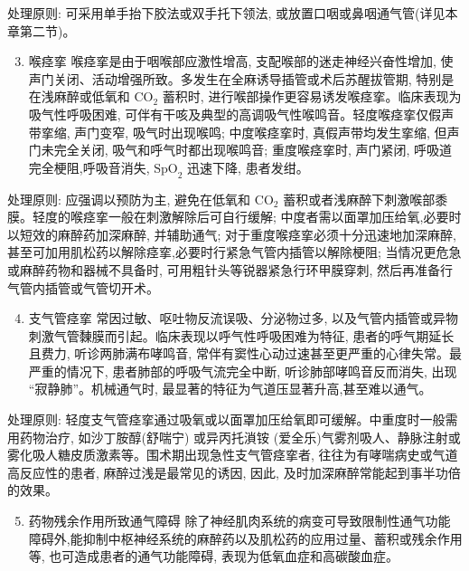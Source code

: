 \documentclass[10pt]{article}
\begin{document}
处理原则: 可采用单手抬下㬵法或双手托下领法, 或放置口咽或鼻咽通气管(详见本章第二节)。

\begin{enumerate}
  \setcounter{enumi}{2}
  \item 喉痉挛 喉痉挛是由于咽喉部应激性增高, 支配喉部的迷走神经兴奋性增加, 使声门关闭、活动增强所致。多发生在全麻诱导插管或术后苏醒拔管期, 特别是在浅麻醉或低氧和 $\mathrm{CO}_{2}$ 蓄积时, 进行喉部操作更容易诱发喉痉挛。临床表现为吸气性呼吸困难, 可伴有干咳及典型的高调吸气性喉鸣音。轻度喉痉挛仅假声带挛缩, 声门变窄, 吸气时出现喉鸣; 中度喉痉挛时, 真假声带均发生挛缩, 但声门未完全关闭, 吸气和呼气时都出现喉鸣音; 重度喉痉挛时, 声门紧闭, 呼吸道完全梗阻,呼吸音消失, $\mathrm{SpO}_{2}$ 迅速下降, 患者发绀。
\end{enumerate}

处理原则: 应强调以预防为主, 避免在低氧和 $\mathrm{CO}_{2}$ 蓄积或者浅麻醉下刺激喉部黍膜。轻度的喉痉挛一般在刺激解除后可自行缓解; 中度者需以面罩加压给氧,必要时以短效的麻醉药加深麻醉, 并辅助通气; 对于重度喉痉挛必须十分迅速地加深麻醉, 甚至可加用肌松药以解除痉挛,必要时行紧急气管内插管以解除梗阻; 当情况更危急或麻醉药物和器械不具备时, 可用粗针头等锐器紧急行环甲膜穿刺, 然后再准备行气管内插管或气管切开术。

\begin{enumerate}
  \setcounter{enumi}{3}
  \item 支气管痉挛 常因过敏、呕吐物反流误吸、分泌物过多, 以及气管内插管或异物刺激气管䵔膜而引起。临床表现以呼气性呼吸困难为特征, 患者的呼气期延长且费力, 听诊两肺满布哮鸣音, 常伴有窦性心动过速甚至更严重的心律失常。最严重的情况下, 患者肺部的呼吸气流完全中断, 听诊肺部哮鸣音反而消失, 出现 “寂静肺”。机械通气时, 最显著的特征为气道压显著升高,甚至难以通气。
\end{enumerate}

处理原则: 轻度支气管痉挛通过吸氧或以面罩加压给氧即可缓解。中重度时一般需用药物治疗, 如沙丁胺醇(舒喘宁) 或异丙托溑铵 (爱全乐)气雾剂吸人、静脉注射或雾化吸人糖皮质激素等。围术期出现急性支气管痉挛者, 往往为有哮喘病史或气道高反应性的患者, 麻醉过浅是最常见的诱因, 因此, 及时加深麻醉常能起到事半功倍的效果。

\begin{enumerate}
  \setcounter{enumi}{4}
  \item 药物残余作用所致通气障碍 除了神经肌肉系统的病变可导致限制性通气功能障碍外,能抑制中枢神经系统的麻醉药以及肌松药的应用过量、蓄积或残余作用等, 也可造成患者的通气功能障碍, 表现为低氧血症和高碳酸血症。
\end{enumerate}
\end{document}
